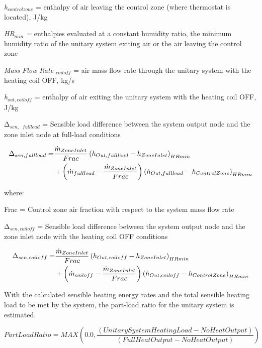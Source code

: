 \emph{h\(_{control zone}\)} = enthalpy of air leaving the control zone (where thermostat is located), J/kg

\emph{HR\(_{min}\) =} enthalpies evaluated at a constant humidity ratio, the minimum humidity ratio of the unitary system exiting air or the air leaving the control zone

\emph{Mass Flow Rate \(_{coil off}\)} = air mass flow rate through the unitary system with the heating coil OFF, kg/s

\emph{h\(_{out, coil off}\)} = enthalpy of air exiting the unitary system with the heating coil OFF, J/kg

Δ\(_{sen,}\) \emph{\(_{full load}\)} = Sensible load difference between the system output node and the zone inlet node at full-load conditions

\begin{equation}
  \begin{split}
    \Delta_{sen,full load} =& \frac{\dot{m}_{ZoneInlet}}{Frac} \PB{h_{Out,full load} - h_{ZoneInlet}}_{HRmin} \\
                              &+ \PB{\dot{m}_{full load} - \frac{\dot{m}_{ZoneInlet}}{Frac}} \PB{h_{Out,full load} - h_{ControlZone}}_{HRmin}
  \end{split}
\end{equation}

where:

Frac = Control zone air fraction with respect to the system mass flow rate

Δ\(_{sen,coil off}\) = Sensible load difference between the system output node and the zone inlet node with the heating coil OFF conditions

\begin{equation}
  \begin{split}
    \Delta_{sen,coil off} =& \frac{\dot{m}_{ZoneInlet}}{Frac} \PB{h_{Out,coil off} - h_{ZoneInlet}}_{HRmin} \\
                              &+ \PB{\dot{m}_{coil off} - \frac{\dot{m}_{ZoneInlet}}{Frac}} \PB{h_{Out,coil off} - h_{ControlZone}}_{HRmin}
  \end{split}
\end{equation}

With the calculated sensible heating energy rates and the total sensible heating load to be met by the system, the part-load ratio for the unitary system is estimated.

\begin{equation}
PartLoadRatio = MAX\left( {0.0,\frac{{\left( {UnitarySystemHeatingLoad - NoHeatOutput} \right)}}{{\left( {FullHeatOutput - NoHeatOutput} \right)}}} \right)
\end{equation}

